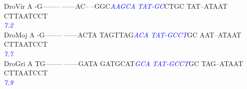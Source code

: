 \documentclass[11pt,twoside,reqno,a4paper]{article}
\begin{document}
{DroVir	A	-G--------	------AC--	--GGC\textit{\textcolor{Blue}{A}}\textit{\textcolor{Blue}{A}}\textit{\textcolor{Blue}{G}}\textit{\textcolor{Blue}{C}}\textit{\textcolor{Blue}{A}}	\textit{\textcolor{Blue}{T}}\textit{\textcolor{Blue}{A}}\textit{\textcolor{Blue}{T}}\textit{\textcolor{Blue}{-}}\textit{\textcolor{Blue}{G}}\textit{\textcolor{Blue}{C}}CTGC	TAT--ATAAT	CTTAATCCT\\
\hspace*{7\charwidth}\hspace*{1\charwidth}\hspace*{1\charwidth}\hspace*{1\charwidth}\hspace*{26\charwidth}\textit{\textcolor{Blue}{7.2}}\hspace*{1\charwidth}\hspace*{1\charwidth}\hspace*{1\charwidth}\\
DroMoj	A	-G--------	------ACTA	TAGTTAG\textit{\textcolor{Blue}{A}}\textit{\textcolor{Blue}{C}}\textit{\textcolor{Blue}{A}}	\textit{\textcolor{Blue}{T}}\textit{\textcolor{Blue}{A}}\textit{\textcolor{Blue}{T}}\textit{\textcolor{Blue}{-}}\textit{\textcolor{Blue}{G}}\textit{\textcolor{Blue}{C}}\textit{\textcolor{Blue}{C}}\textit{\textcolor{Blue}{T}}GC	AAT--ATAAT	CTTAATCCT\\
\hspace*{7\charwidth}\hspace*{1\charwidth}\hspace*{1\charwidth}\hspace*{1\charwidth}\hspace*{28\charwidth}\textit{\textcolor{Blue}{7.7}}\hspace*{1\charwidth}\hspace*{1\charwidth}\hspace*{1\charwidth}\\
DroGri	A	TG--------	------GATA	GATGCAT\textit{\textcolor{Blue}{G}}\textit{\textcolor{Blue}{C}}\textit{\textcolor{Blue}{A}}	\textit{\textcolor{Blue}{T}}\textit{\textcolor{Blue}{A}}\textit{\textcolor{Blue}{T}}\textit{\textcolor{Blue}{-}}\textit{\textcolor{Blue}{G}}\textit{\textcolor{Blue}{C}}\textit{\textcolor{Blue}{C}}\textit{\textcolor{Blue}{T}}GC	TAG--ATAAT	CTTAATCCT\\
\hspace*{7\charwidth}\hspace*{1\charwidth}\hspace*{1\charwidth}\hspace*{1\charwidth}\hspace*{28\charwidth}\textit{\textcolor{Blue}{7.9}}\hspace*{1\charwidth}\hspace*{1\charwidth}\hspace*{1\charwidth}\\
}
\end{document}
